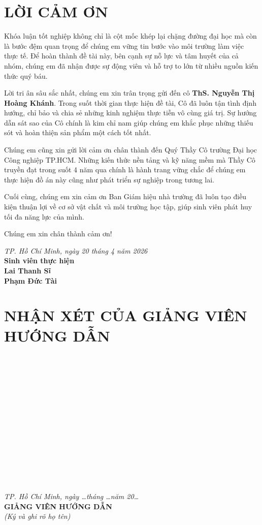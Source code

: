 \documentclass[a4paper,12pt]{extreport}
\newcommand{\dotline}{
    \noindent\makebox[\linewidth]{\dotfill}\\[10pt]
}
\begin{document}
\newpage
\pagestyle{frontmatter}
\chapter*{LỜI CẢM ƠN}
\thispagestyle{frontmatter}

Khóa luận tốt nghiệp không chỉ là cột mốc khép lại chặng đường đại học mà còn là bước đệm quan trọng để chúng em vững tin bước vào môi trường làm việc thực tế. Để hoàn thành đề tài này, bên cạnh sự nỗ lực và tâm huyết của cả nhóm, chúng em đã nhận được sự động viên và hỗ trợ to lớn từ nhiều nguồn kiến thức quý báu.

Lời tri ân sâu sắc nhất, chúng em xin trân trọng gửi đến cô \textbf{ThS. Nguyễn Thị Hoàng Khánh}. Trong suốt thời gian thực hiện đề tài, Cô đã luôn tận tình định hướng, chỉ bảo và chia sẻ những kinh nghiệm thực tiễn vô cùng giá trị. Sự hướng dẫn sát sao của Cô chính là kim chỉ nam giúp chúng em khắc phục những thiếu sót và hoàn thiện sản phẩm một cách tốt nhất.

Chúng em cũng xin gửi lời cảm ơn chân thành đến Quý Thầy Cô trường Đại học Công nghiệp TP.HCM. Những kiến thức nền tảng và kỹ năng mềm mà Thầy Cô truyền đạt trong suốt 4 năm qua chính là hành trang vững chắc để chúng em thực hiện đồ án này cũng như phát triển sự nghiệp trong tương lai.

Cuối cùng, chúng em xin cảm ơn Ban Giám hiệu nhà trường đã luôn tạo điều kiện thuận lợi về cơ sở vật chất và môi trường học tập, giúp sinh viên phát huy tối đa năng lực của mình.

Chúng em xin chân thành cảm ơn!

\vspace{1cm}
\begin{flushright}
    \textit{TP. Hồ Chí Minh, ngày 20 tháng 4 năm 2026}\\
    \textbf{Sinh viên thực hiện}\\
    \textbf{Lai Thanh Sĩ}\\
    \textbf{Phạm Đức Tài}
\end{flushright}

\newpage
\chapter*{NHẬN XÉT CỦA GIẢNG VIÊN HƯỚNG DẪN}
\thispagestyle{frontmatter}
\dotline \dotline \dotline \dotline \dotline
\dotline \dotline \dotline \dotline \dotline
\dotline \dotline \dotline 
\vspace{0.5cm}
\begin{flushright}
    \textit{TP. Hồ Chí Minh, ngày \dots tháng \dots năm 20\dots}\\
    \textbf{GIẢNG VIÊN HƯỚNG DẪN}\\
    \textit{(Ký và ghi rõ họ tên)}\\
    \vspace{1.5cm}
\end{flushright}
\end{document}

